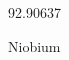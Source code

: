 \documentclass[12pt]{article}
\begin{document}
\hfill{}
\vfill
\begin{center}
  {\fontsize{50}{60}
  }

  92.90637

Niobium
\end{center}
\vfill
\end{document}
